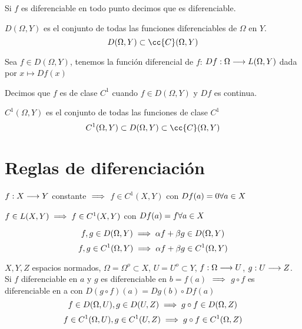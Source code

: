 \begin{definicion}
    Si $f$ es diferenciable en todo punto decimos que es diferenciable.
\end{definicion}

\begin{definicion}
    $D(\Omega, Y)$ es el conjunto de todas las funciones diferenciables de $\Omega$ en $Y$.
    $$D(\Omega,Y) \subset \cc{C}(\Omega,Y)$$
\end{definicion}

\begin{definicion}[Diferencial de $f$]
    Sea $f\in D(\Omega, Y)$, tenemos la función diferencial de $f$: $Df:\Omega\longrightarrow L(\Omega,Y)$ dada por $x\longmapsto Df(x)$
\end{definicion}

\begin{definicion}
    Decimos que $f$ es de clase $C^1$ cuando $f\in D(\Omega, Y)$ y $Df$ es continua.
\end{definicion}

\begin{definicion}
    $C^1(\Omega,Y)$ es el conjunto de todas las funciones de clase $C^1$
    $$C^1(\Omega,Y) \subset D(\Omega,Y) \subset \cc{C}(\Omega,Y)$$
\end{definicion}

\section{Reglas de diferenciación}

\begin{ejemplo}
    $f:X\longrightarrow Y$ constante $\implies$ $f\in C^1(X,Y)$ con $Df(a) = 0\\\forall a \in X$
\end{ejemplo}

\begin{ejemplo}
    $f\in L(X,Y) \implies f\in C^1(X,Y)$ con $Df(a) = f\\\forall a \in X$
\end{ejemplo}

\begin{prop}
    $$f,g \in D(\Omega,Y)\implies \alpha f + \beta g \in D(\Omega,Y)$$
    $$f,g \in C^1(\Omega,Y)\implies \alpha f + \beta g \in C^1(\Omega,Y)$$
\end{prop}

\begin{teo}
    $X,Y,Z$ espacios normados, $\Omega = \Omega^o \subset X$, $U = U^o \subset Y$, $f:\Omega\longrightarrow U$, $g:U\longrightarrow Z$.\newline
    Si $f$ diferenciable en $a$ y $g$ es diferenciable en $b=f(a)$ $\implies$ $g\circ f$ es diferenciable en a con $D(g\circ f)(a) = Dg(b)\circ Df(a)$
    $$f\in D(\Omega,U),g\in D(U,Z)\implies g\circ f \in D(\Omega,Z)$$
    $$f\in C^1(\Omega,U),g\in C^1(U,Z)\implies g\circ f \in C^1(\Omega,Z)$$
\end{teo}

